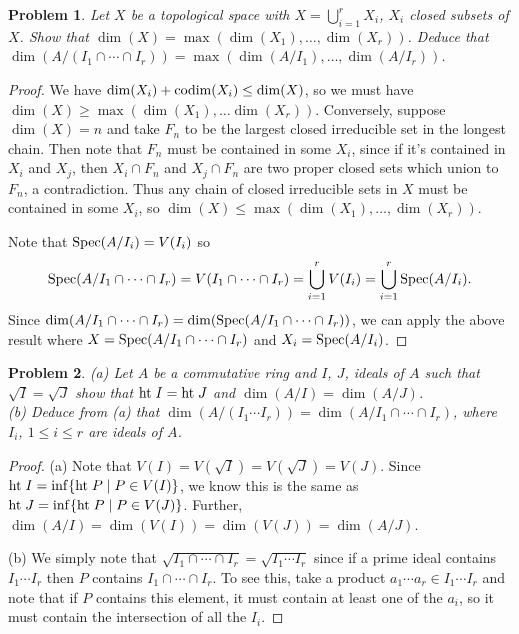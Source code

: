 \documentclass{article}
\newcommand{\spec}{\textup{Spec}}
\newcommand{\Ht}{\textup{ht}\;}
\newcommand{\codim}{\textup{codim}}
\newtheorem{problem}{Problem}
\begin{document}
\begin{problem}
Let $X$ be a topological space with $X = \bigcup_{i=1}^r X_i$, $X_i$ closed subsets of $X$. Show that $\dim(X) = \max(\dim(X_1), \dots , \dim(X_r))$. Deduce that $\dim(A/(I_1 \cap \cdots \cap I_r)) = \max(\dim(A/I_1), \dots , \dim(A/I_r))$.
\end{problem}
\begin{proof}
We have $\dim(X_i) + \codim(X_i) \leq \dim(X)$, so we must have $\dim(X) \geq \max(\dim(X_1), \dots \dim(X_r))$. Conversely, suppose $\dim(X) = n$ and take $F_n$ to be the largest closed irreducible set in the longest chain. Then note that $F_n$ must be contained in some $X_i$, since if it's contained in $X_i$ and $X_j$, then $X_i \cap F_n$ and $X_j \cap F_n$ are two proper closed sets which union to $F_n$, a contradiction. Thus any chain of closed irreducible sets in $X$ must be contained in some $X_i$, so $\dim(X) \leq \max(\dim(X_1), \dots , \dim(X_r))$.

Note that $\spec(A/I_i) = V(I_i)$ so
\[
\spec(A/I_1 \cap \cdots \cap I_r) = V(I_1 \cap \cdots \cap I_r) = \bigcup_{i=1}^r V(I_i) = \bigcup_{i=1}^r \spec(A/I_i).
\]
Since $\dim(A/I_1 \cap \cdots \cap I_r) = \dim(\spec(A/I_1 \cap \cdots \cap I_r))$, we can apply the above result where $X = \spec(A/I_1 \cap \cdots \cap I_r)$ and $X_i = \spec(A/I_i)$.
\end{proof}

\begin{problem}
(a) Let $A$ be a commutative ring and $I$, $J$, ideals of $A$ such that $\sqrt{I} = \sqrt{J}$ show that $\Ht I = \Ht J$ and $\dim(A/I) = \dim(A/J)$.\\
(b) Deduce from (a) that $\dim(A/(I_1 \cdots I_r)) = \dim(A/I_1 \cap \cdots \cap I_r)$, where $I_i$, $1 \leq i \leq r$ are ideals of $A$.
\end{problem}
\begin{proof}
(a) Note that $V(I) = V(\sqrt{I}) = V(\sqrt{J}) = V(J)$. Since $\Ht I = \inf \{\Ht P \mid P \in V(I)\}$, we know this is the same as $\Ht J = \inf \{\Ht P \mid P \in V(J)\}$. Further, $\dim(A/I) = \dim(V(I)) = \dim(V(J)) = \dim(A/J)$.

(b) We simply note that $\sqrt{I_1 \cap \cdots \cap I_r} = \sqrt{I_1 \cdots I_r}$ since if a prime ideal contains $I_1 \cdots I_r$ then $P$ contains $I_1 \cap \cdots \cap I_r$. To see this, take a product $a_1 \cdots a_r \in I_1 \cdots I_r$ and note that if $P$ contains this element, it must contain at least one of the $a_i$, so it must contain the intersection of all the $I_i$.
\end{proof}
\end{document}
